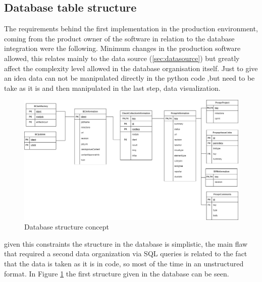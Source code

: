 \documentclass[../main.tex]{subfiles}
\begin{document}
\subsection{Database table structure}
The requirements behind the first implementation in the production environment, coming from the product owner of the software in relation to the database integration were the following. Minimum changes in the production software allowed, this relates mainly to the data source (\ref{sec:datasource}) but greatly affect the complexity level allowed in the database organisation itself. Just to give an idea data can not be manipulated directly in the python code ,but need to be take as it is and then manipulated in the last step, data visualization. 
\begin{figure}[H]
    \centering
    \includegraphics[width=\linewidth]{images_folder/EADBEntity.png}
    \caption{Database structure concept}
    \label{fig:dbsterconce}
\end{figure}
given this constraints the structure in the database is simplistic, the main flaw that required a second data organization via SQL queries is related to the fact that the data is taken as it is in code, so most of the time in an unstructured format. In Figure \ref{fig:dbsterconce} the first structure given in the database can be seen.
\end{document}
